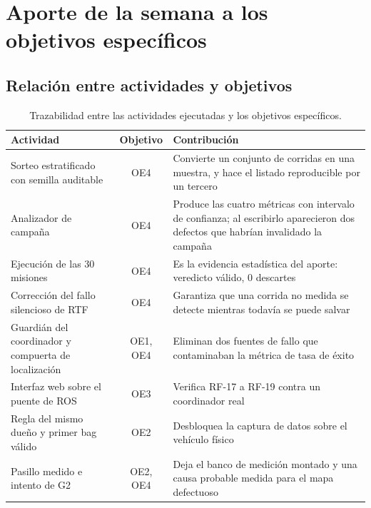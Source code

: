 \documentclass[12pt,letterpaper]{article}
\begin{document}
\section{Aporte de la semana a los objetivos específicos}
\label{sec:aporte}

\subsection{Relación entre actividades y objetivos}

\begin{table}[H]
    \centering
    \small
    \caption{Trazabilidad entre las actividades ejecutadas y los objetivos específicos.}
    \label{tab:trazabilidad}
    \begin{tabular}{@{}p{4.0cm}cp{7.6cm}@{}}
        \toprule
        \textbf{Actividad} & \textbf{Objetivo} & \textbf{Contribución} \\ \midrule
        Sorteo estratificado con semilla auditable & OE4 & Convierte un conjunto de corridas en una muestra, y hace el listado reproducible por un tercero \\ \addlinespace
        Analizador de campaña & OE4 & Produce las cuatro métricas con intervalo de confianza; al escribirlo aparecieron dos defectos que habrían invalidado la campaña \\ \addlinespace
        Ejecución de las 30 misiones & OE4 & Es la evidencia estadística del aporte: veredicto válido, 0 descartes \\ \addlinespace
        Corrección del fallo silencioso de RTF & OE4 & Garantiza que una corrida no medida se detecte mientras todavía se puede salvar \\ \addlinespace
        Guardián del coordinador y compuerta de localización & OE1, OE4 & Eliminan dos fuentes de fallo que contaminaban la métrica de tasa de éxito \\ \addlinespace
        Interfaz web sobre el puente de ROS & OE3 & Verifica RF-17 a RF-19 contra un coordinador real \\ \addlinespace
        Regla del mismo dueño y primer bag válido & OE2 & Desbloquea la captura de datos sobre el vehículo físico \\ \addlinespace
        Pasillo medido e intento de G2 & OE2, OE4 & Deja el banco de medición montado y una causa probable medida para el mapa defectuoso \\ \bottomrule
    \end{tabular}
\end{table}
\end{document}
